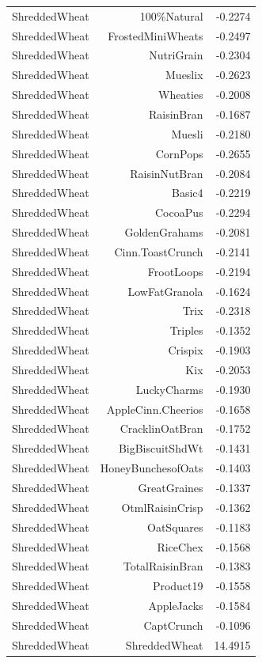 \begin{longtable}{@{}lrr@{}}
ShreddedWheat & 100\%Natural & -0.2274 \\
ShreddedWheat & FrostedMiniWheats & -0.2497 \\
ShreddedWheat & NutriGrain & -0.2304 \\
ShreddedWheat & Mueslix & -0.2623 \\
ShreddedWheat & Wheaties & -0.2008 \\
ShreddedWheat & RaisinBran & -0.1687 \\
ShreddedWheat & Muesli & -0.2180 \\
ShreddedWheat & CornPops & -0.2655 \\
ShreddedWheat & RaisinNutBran & -0.2084 \\
ShreddedWheat & Basic4 & -0.2219 \\
ShreddedWheat & CocoaPus & -0.2294 \\
ShreddedWheat & GoldenGrahams & -0.2081 \\
ShreddedWheat & Cinn.ToastCrunch & -0.2141 \\
ShreddedWheat & FrootLoops & -0.2194 \\
ShreddedWheat & LowFatGranola & -0.1624 \\
ShreddedWheat & Trix & -0.2318 \\
ShreddedWheat & Triples & -0.1352 \\
ShreddedWheat & Crispix & -0.1903 \\
ShreddedWheat & Kix & -0.2053 \\
ShreddedWheat & LuckyCharms & -0.1930 \\
ShreddedWheat & AppleCinn.Cheerios & -0.1658 \\
ShreddedWheat & CracklinOatBran & -0.1752 \\
ShreddedWheat & BigBiscuitShdWt & -0.1431 \\
ShreddedWheat & HoneyBunchesofOats & -0.1403 \\
ShreddedWheat & GreatGraines & -0.1337 \\
ShreddedWheat & OtmlRaisinCrisp & -0.1362 \\
ShreddedWheat & OatSquares & -0.1183 \\
ShreddedWheat & RiceChex & -0.1568 \\
ShreddedWheat & TotalRaisinBran & -0.1383 \\
ShreddedWheat & Product19 & -0.1558 \\
ShreddedWheat & AppleJacks & -0.1584 \\
ShreddedWheat & CaptCrunch & -0.1096 \\
ShreddedWheat & ShreddedWheat & 14.4915 \\

\end{longtable}
